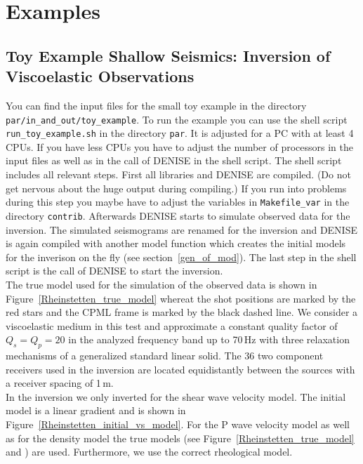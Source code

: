 
\chapter{Examples}

\section{Toy Example Shallow Seismics: Inversion of Viscoelastic Observations}
You can find the input files for the small toy example in the directory \texttt{par/in\_and\_out/toy\_example}. To run the example you can use the shell script \texttt{run\_toy\_example.sh} in the directory \texttt{par}. It is adjusted for a PC with at least 4 CPUs. If you have less CPUs you have to adjust the number of processors in the input files as well as in the call of DENISE in the shell script. The shell script includes all relevant steps. First all libraries and DENISE are compiled. (Do not get nervous about the huge output during compiling.) If you run into problems during this step you maybe have to adjust the variables in \texttt{Makefile\_var} in the directory \texttt{contrib}. Afterwards DENISE starts to simulate observed data for the inversion. The simulated seismograms are renamed for the inversion and DENISE is again compiled with another model function which creates the initial models for the inverison on the fly (see section~\ref{gen_of_mod}). The last step in the shell script is the call of DENISE to start the inversion.\\

The true model used for the simulation of the observed data is shown in Figure~\ref{Rheinstetten_true_model} whereat the shot positions are marked by the red stars and the CPML frame is marked by the black dashed line. We consider a viscoelastic medium in this test and approximate a constant quality factor of $Q_s=Q_p=20$ in the analyzed frequency band up to 70\,Hz with three relaxation mechanisms of a generalized standard linear solid. The 36 two component receivers used in the inversion are located equidistantly between the sources with a receiver spacing of 1\,m.\\

In the inversion we only inverted for the shear wave velocity model. The initial model is a linear gradient and is shown in Figure~\ref{Rheinstetten_initial_vs_model}.  For the P wave velocity model as well as for the density model the true models (see Figure~\ref{Rheinstetten_true_model} and ) are used. Furthermore, we use the correct rheological model.\\

